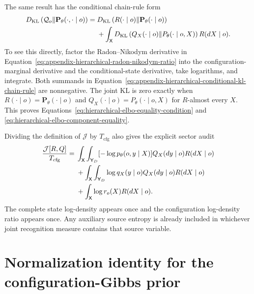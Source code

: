 The same result has the conditional chain-rule form
\begin{align}
D_{\mathrm{KL}}\left(
\mathcal Q_o
\middle\Vert
\mathbf P_\theta(\mathord\cdot,\mathord\cdot\mid o)
\right)
={}&
D_{\mathrm{KL}}\left(
R(\mathord\cdot\mid o)
\middle\Vert
\mathbf P_\theta(\mathord\cdot\mid o)
\right)
\label{eq:appendix-hierarchical-conditional-kl-chain-rule}\\
&+\int_{\mathsf X}
D_{\mathrm{KL}}\left(
Q_X(\mathord\cdot\mid o)
\middle\Vert
P_\theta(\mathord\cdot\mid o,X)
\right)
R(dX\mid o).
\notag
\end{align}
To see this directly, factor the Radon--Nikodym derivative in Equation~\eqref{eq:appendix-hierarchical-radon-nikodym-ratio} into the configuration-marginal derivative and the conditional-state derivative, take logarithms, and integrate. Both summands in Equation~\eqref{eq:appendix-hierarchical-conditional-kl-chain-rule} are nonnegative. The joint KL is zero exactly when
\(R(\mathord\cdot\mid o)=\mathbf P_\theta(\mathord\cdot\mid o)\) and
\(Q_X(\mathord\cdot\mid o)=P_\theta(\mathord\cdot\mid o,X)\) for \(R\)-almost every \(X\). This proves Equations~\eqref{eq:hierarchical-elbo-equality-condition} and \eqref{eq:hierarchical-elbo-component-equality}.

Dividing the definition of \(\mathcal J\) by \(T_{\mathrm{cfg}}\) also gives the explicit sector audit
\begin{align}
\frac{\mathcal J[R,Q]}{T_{\mathrm{cfg}}}
={}&
\int_{\mathsf X}\int_{\mathsf Y_D}
[-\log p_\theta(o,y\mid X)]Q_X(dy\mid o)R(dX\mid o)
\notag\\
&+\int_{\mathsf X}\int_{\mathsf Y_D}
\log q_X(y\mid o)Q_X(dy\mid o)R(dX\mid o)
\label{eq:appendix-hierarchical-entropy-sector-audit}\\
&+\int_{\mathsf X}
\log r_o(X)R(dX\mid o).
\notag
\end{align}
The complete state log-density appears once and the configuration log-density ratio appears once. Any auxiliary source entropy is already included in whichever joint recognition measure contains that source variable.

\section{Normalization identity for the configuration-Gibbs prior}
\label{sec:configuration-gibbs-proof}

